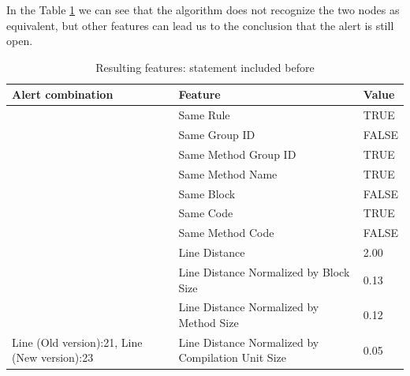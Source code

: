 \documentclass[
]{article}
\begin{document}
\newpage

In the Table \ref{nested_in_other_if} we can see that the algorithm does
not recognize the two nodes as equivalent, but other features can lead
us to the conclusion that the alert is still open.

\small

\begin{table}[!h]

\caption{\label{tab:unnamed-chunk-12}Resulting features: statement included before \label{nested_in_other_if} }
\centering
\begin{tabular}[t]{l|l|l}
\hline
Alert combination & Feature & Value\\
\hline
\rowcolor{gray!6}   & Same Rule & TRUE\\

 & Same Group ID & FALSE\\

\rowcolor{gray!6}   & Same Method Group ID & TRUE\\

 & Same Method Name & TRUE\\

\rowcolor{gray!6}   & Same Block & FALSE\\

 & Same Code & TRUE\\

\rowcolor{gray!6}   & Same Method Code & FALSE\\

 & Line Distance & 2.00\\

\rowcolor{gray!6}   & Line Distance Normalized by Block Size & 0.13\\

 & Line Distance Normalized by Method Size & 0.12\\

\multirow[t]{-11}{*}{\raggedright\arraybackslash Line (Old version):21, Line (New version):23} & Line Distance Normalized by Compilation Unit Size & 0.05\\
\hline
\end{tabular}
\end{table}

\normalsize

\newpage
\end{document}
